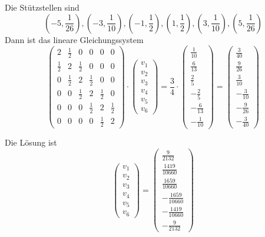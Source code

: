 \documentclass[10pt,a4paper]{article}
\begin{document}
Die Stützstellen sind
\begin{equation}
  (-5, \frac{1}{26}), (-3, \frac{1}{10}), (-1, \frac{1}{2}), (1, \frac{1}{2}), (3, \frac{1}{10}), (5, \frac{1}{26})
\end{equation}
Dann ist das lineare Gleichungssystem
\begin{equation}
  \begin{pmatrix}
    2 & \frac{1}{2} & 0 & 0 & 0 & 0\\
    \frac{1}{2} & 2 & \frac{1}{2} & 0 & 0 & 0\\
    0 & \frac{1}{2} & 2 & \frac{1}{2} & 0 & 0\\
    0 & 0 & \frac{1}{2} & 2 & \frac{1}{2} & 0\\
    0 & 0 & 0 & \frac{1}{2} & 2 & \frac{1}{2}\\
    0 & 0 & 0 & 0 & \frac{1}{2} & 2
  \end{pmatrix}
  \cdot
  \begin{pmatrix}
    v_{1}\\
    v_{2}\\
    v_{3}\\
    v_{4}\\
    v_{5}\\
    v_{6}
  \end{pmatrix}
  =
  \frac{3}{4} \cdot
  \begin{pmatrix}
    \frac{1}{10}\\
    \frac{6}{13}\\
    \frac{2}{5}\\
    -\frac{2}{5}\\
    -\frac{6}{13}\\
    -\frac{1}{10}
  \end{pmatrix}
  =
  \begin{pmatrix}
    \frac{3}{40}\\
    \frac{9}{26}\\
    \frac{3}{10}\\
    -\frac{3}{10}\\
    -\frac{9}{26}\\
    -\frac{3}{40}
  \end{pmatrix}
\end{equation}

Die Lösung ist
\begin{equation}
  \begin{pmatrix}
    v_{1}\\
    v_{2}\\
    v_{3}\\
    v_{4}\\
    v_{5}\\
    v_{6}
  \end{pmatrix}
  =
  \begin{pmatrix}
    \frac{9}{2132}\\
    \frac{1419}{10660}\\
    \frac{1659}{10660}\\
    -\frac{1659}{10660}\\
    -\frac{1419}{10660}\\
    -\frac{9}{2132}
  \end{pmatrix}
\end{equation}
\end{document}
